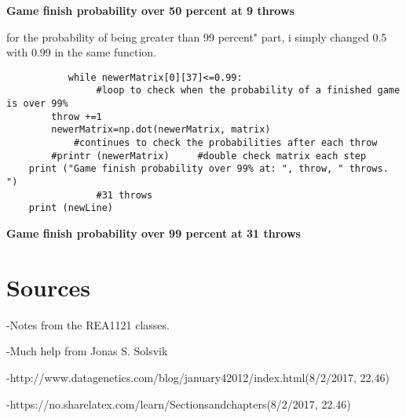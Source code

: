 \documentclass{article}
\begin{document}
\textbf{Game finish probability over 50 percent at 9 throws}

for the probability of being greater than 99 percent" part, i simply changed 0.5 with 0.99 in the same function.

\begin{verbatim}
           while newerMatrix[0][37]<=0.99:      
                #loop to check when the probability of a finished game is over 99%
        throw +=1
        newerMatrix=np.dot(newerMatrix, matrix)      
            #continues to check the probabilities after each throw
        #printr (newerMatrix)     #double check matrix each step
    print ("Game finish probability over 99% at: ", throw, " throws. ")   
                #31 throws
    print (newLine)
\end{verbatim}

\textbf{Game finish probability over 99 percent at 31 throws}

\section{Sources}
    -Notes from the REA1121 classes.

    -Much help from Jonas S. Solsvik
  
    -http://www.datagenetics.com/blog/january42012/index.html(8/2/2017, 22.46)
    
    -https://no.sharelatex.com/learn/Sectionsandchapters(8/2/2017, 22.46)
\end{document}
